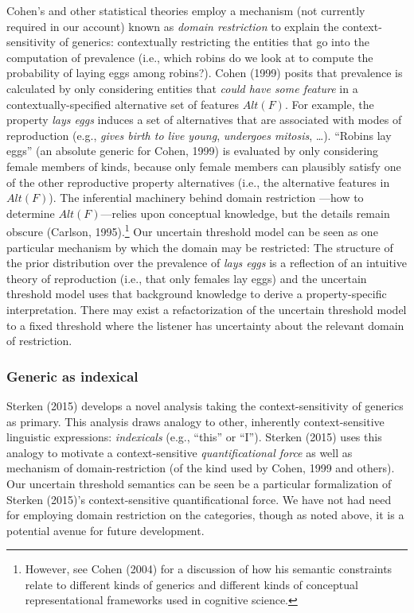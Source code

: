 \documentclass[english,,man,floatsintext]{apa6}
\let\rmarkdownfootnote\footnote%
\def\footnote{\protect\rmarkdownfootnote}
\theoremstyle{definition}
\theoremstyle{definition}
\theoremstyle{definition}
\theoremstyle{remark}
\begin{document}
Cohen's and other statistical theories employ a mechanism (not currently
required in our account) known as \emph{domain restriction} to explain
the context-sensitivity of generics: contextually restricting the
entities that go into the computation of prevalence (i.e., which robins
do we look at to compute the probability of laying eggs among robins?).
Cohen (1999) posits that prevalence is calculated by only considering
entities that \emph{could have some feature} in a contextually-specified
alternative set of features \(Alt(F)\). For example, the property
\emph{lays eggs} induces a set of alternatives that are associated with
modes of reproduction (e.g., \emph{gives birth to live young},
\emph{undergoes mitosis}, \ldots{}). \enquote{Robins lay eggs} (an
absolute generic for Cohen, 1999) is evaluated by only considering
female members of kinds, because only female members can plausibly
satisfy one of the other reproductive property alternatives (i.e., the
alternative features in \(Alt(F)\)). The inferential machinery behind
domain restriction ---how to determine \(Alt(F)\)---relies upon
conceptual knowledge, but the details remain obscure (Carlson,
1995).\footnote{However, see Cohen (2004) for a discussion of how his
  semantic constraints relate to different kinds of generics and
  different kinds of conceptual representational frameworks used in
  cognitive science.} Our uncertain threshold model can be seen as one
particular mechanism by which the domain may be restricted: The
structure of the prior distribution over the prevalence of \emph{lays
eggs} is a reflection of an intuitive theory of reproduction (i.e., that
only females lay eggs) and the uncertain threshold model uses that
background knowledge to derive a property-specific interpretation. There
may exist a refactorization of the uncertain threshold model to a fixed
threshold where the listener has uncertainty about the relevant domain
of restriction.

\hypertarget{generic-as-indexical}{%
\subsubsection{Generic as indexical}\label{generic-as-indexical}}

Sterken (2015) develops a novel analysis taking the context-sensitivity
of generics as primary. This analysis draws analogy to other, inherently
context-sensitive linguistic expressions: \emph{indexicals} (e.g.,
\enquote{this} or \enquote{I}). Sterken (2015) uses this analogy to
motivate a context-sensitive \emph{quantificational force} as well as
mechanism of domain-restriction (of the kind used by Cohen, 1999 and
others). Our uncertain threshold semantics can be seen be a particular
formalization of Sterken (2015)'s context-sensitive quantificational
force. We have not had need for employing domain restriction on the
categories, though as noted above, it is a potential avenue for future
development.
\end{document}
